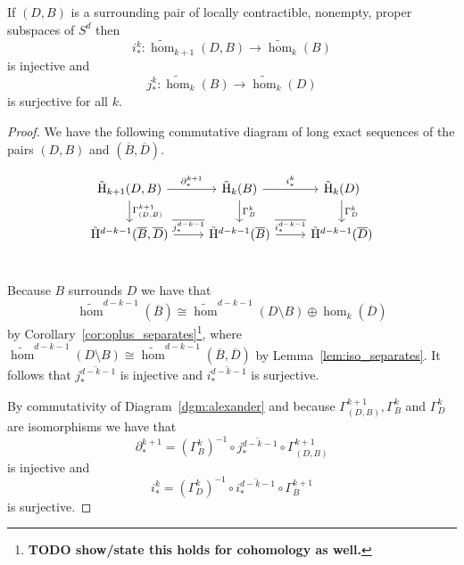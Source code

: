 \begin{lemma}\label{lem:alexander_comm}
  If $(D,B)$ is a surrounding pair of locally contractible, nonempty, proper subspaces of $S^d$ then
  \[i_*^{k} : \tilde{\hom}_{k+1}(D, B)\to \tilde{\hom}_k(B)\]
  is injective and
  \[j_*^{k} : \tilde{\hom}_{k}(B)\to \tilde{\hom}_k(D)\]
  is surjective for all $k$.
\end{lemma}
\begin{proof}
  We have the following commutative diagram of long exact sequences of the pairs $(D, B)$ and $(\overline{B}, \overline{D})$.

  \begin{equation}\begin{tikzcd}\label{dgm:alexander}
    \tilde{\hom}_{k+1}(D, B)\arrow{r}{\partial_*^{k+1}}\arrow{d}{\Gamma^{k+1}_{(D, B)}} &
    \tilde{\hom}_{k}(B)\arrow{r}{i_*^{k}}\arrow{d}{\Gamma^{k}_B} &
    \tilde{\hom}_{k}(D)\arrow{d}{\Gamma^{k}_D} \\ %
    \tilde{\hom}^{d-k-1}(\overline{B}, \overline{D})\arrow{r}{\overline{j_*^{d-k-1}}} &
    \tilde{\hom}^{d-k-1}(\overline{B})\arrow{r}{\overline{i_*^{d-k-1}}} &
    \tilde{\hom}^{d-k-1}(\overline{D}) \\ %
  \end{tikzcd}\end{equation}

  Because $B$ surrounds $D$ we have that
  \[\tilde{\hom}^{d-k-1}(\overline{B}) \cong \tilde{\hom}^{d-k-1}(D\setminus B)\oplus \hom_k(\overline{D})\]
  by Corollary~\ref{cor:oplus_separates}\footnote{\textbf{TODO show/state this holds for cohomology as well.}}, where $\tilde{\hom}^{d-k-1}(D\setminus B) \cong \tilde{\hom}^{d-k-1}(\overline{B}, \overline{D})$ by Lemma~\ref{lem:iso_separates}.
  It follows that $\overline{j_*^{d-k-1}}$ is injective and $\overline{i_*^{d-k-1}}$ is surjective.

  By commutativity of Diagram~\ref{dgm:alexander} and because $\Gamma_{(D,B)}^{k+1}, \Gamma_B^k$ and $\Gamma_D^k$ are isomorphisms we have that
  \[\partial_*^{k+1} = (\Gamma_B^{k})^{-1} \circ\overline{j_*^{d-k-1}}\circ \Gamma_{(D,B)}^{k+1}\]
  is injective and
  \[i_*^{k} = (\Gamma_D^{k})^{-1} \circ\overline{i_*^{d-k-1}}\circ \Gamma_B^{k+1}\]
  is surjective.
\end{proof}

